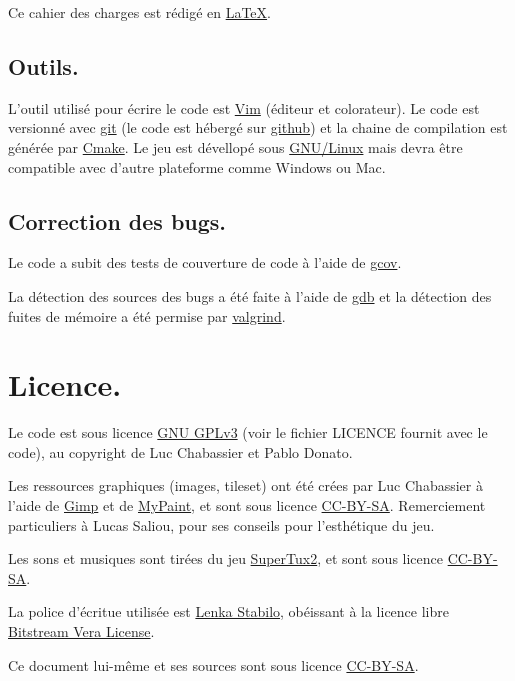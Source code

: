 \documentclass{article}
\begin{document}
Ce cahier des charges est rédigé en \href{http://www.latex-project.org/}{\LaTeX}.

\subsection{Outils.}
L'outil utilisé pour écrire le code est \href{http://www.vim.org/}{Vim} (éditeur et colorateur). Le code est versionné avec \href{http://git-scm.com/}{git} (le code est hébergé sur \href{https://github.com/Lycee/ISN\_snake}{github}) et la chaine de compilation est générée par \href{http://www.cmake.org/}{Cmake}. Le jeu est dévellopé sous \href{https://en.wikipedia.org/wiki/Linux}{GNU/Linux} mais devra être compatible avec d'autre plateforme comme Windows ou Mac.

\subsection{Correction des bugs.}
Le code a subit des tests de couverture de code à l'aide de \href{http://gcc.gnu.org/onlinedocs/gcc-4.5.2/gcc/Gcov.html#Gcov}{gcov}.

La détection des sources des bugs a été faite à l'aide de \href{https://www.gnu.org/software/gdb/}{gdb} et la détection des fuites de mémoire a été permise par \href{http://www.valgrind.org/}{valgrind}.

\section{Licence.}
Le code est sous licence \href{http://gplv3.fsf.org/}{GNU GPLv3} (voir le fichier LICENCE fournit avec le code), au copyright de Luc Chabassier et Pablo Donato.

Les ressources graphiques (images, tileset) ont été crées par Luc Chabassier à l'aide de \href{http://www.gimp.org/}{Gimp} et de \href{http://mypaint.intilinux.com/}{MyPaint}, et sont sous licence \href{https://creativecommons.org/licenses/by-sa/2.0/}{CC-BY-SA}. Remerciement particuliers à Lucas Saliou, pour ses conseils pour l'esthétique du jeu.

Les sons et musiques sont tirées du jeu \href{http://supertux.lethargik.org/}{SuperTux2}, et sont sous licence \href{https://creativecommons.org/licenses/by-sa/2.0/}{CC-BY-SA}.

La police d'écritue utilisée est \href{http://openfontlibrary.org/en/font/lenka-stabilo}{Lenka Stabilo}, obéissant à la licence libre \href{http://www-old.gnome.org/fonts/}{Bitstream Vera License}.

Ce document lui-même et ses sources sont sous licence \href{https://creativecommons.org/licenses/by-sa/2.0/}{CC-BY-SA}.
\end{document}
